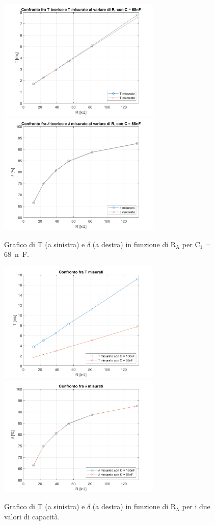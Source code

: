 \documentclass{report}
\begin{document}
\begin{figure}[h!]
	\centering
	\includegraphics[height=5.8cm]{immagini/graficoT2}
	\includegraphics[height=5.8cm]{immagini/graficoDC2}
	\caption{Grafico di T (a sinistra) e $\delta$ (a destra) in funzione di $\mathrm{R_A}$ per $\mathrm{C_1}$ = \SI{68}{n\farad}.}
	\label{figura:graficiC2}
\end{figure}
\begin{figure}[h!]
	\centering
	\includegraphics[height=5.8cm]{immagini/graficoConfrontoT}
	\includegraphics[height=5.8cm]{immagini/graficoConfrontoDC}
	\caption{Grafico di T (a sinistra) e $\delta$ (a destra) in funzione di $\mathrm{R_A}$ per i due valori di capacità.}
	\label{figura:graficiC12}
\end{figure}
\end{document}
